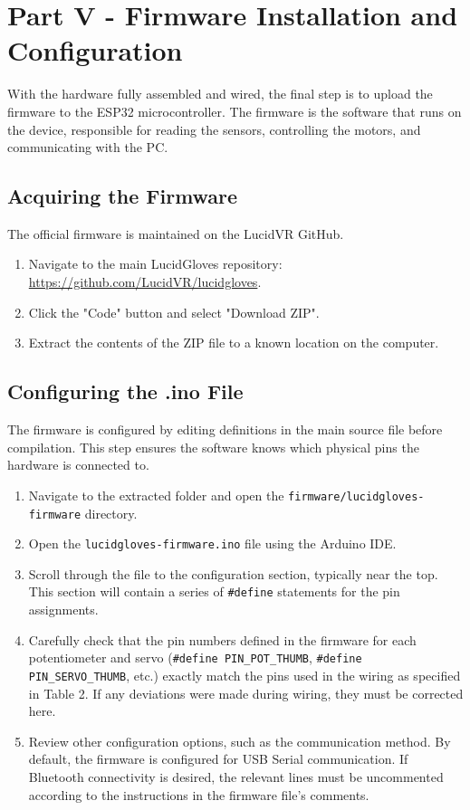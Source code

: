 \documentclass{article}
\begin{document}
\newpage
\section{Part V - Firmware Installation and Configuration}
With the hardware fully assembled and wired, the final step is to upload the firmware to the ESP32 microcontroller. The firmware is the software that runs on the device, responsible for reading the sensors, controlling the motors, and communicating with the PC.

\subsection{Acquiring the Firmware}
The official firmware is maintained on the LucidVR GitHub.
\begin{enumerate}
    \item Navigate to the main LucidGloves repository: \url{https://github.com/LucidVR/lucidgloves}.
    \item Click the "Code" button and select "Download ZIP".
    \item Extract the contents of the ZIP file to a known location on the computer.
\end{enumerate}

\subsection{Configuring the .ino File}
The firmware is configured by editing definitions in the main source file before compilation. This step ensures the software knows which physical pins the hardware is connected to.
\begin{enumerate}
    \item Navigate to the extracted folder and open the \texttt{firmware/lucidgloves-firmware} directory.
    \item Open the \texttt{lucidgloves-firmware.ino} file using the Arduino IDE.
    \item Scroll through the file to the configuration section, typically near the top. This section will contain a series of \texttt{\#define} statements for the pin assignments.
    \item Carefully check that the pin numbers defined in the firmware for each potentiometer and servo (\texttt{\#define PIN\_POT\_THUMB}, \texttt{\#define PIN\_SERVO\_THUMB}, etc.) exactly match the pins used in the wiring as specified in Table 2. If any deviations were made during wiring, they must be corrected here.
    \item Review other configuration options, such as the communication method. By default, the firmware is configured for USB Serial communication. If Bluetooth connectivity is desired, the relevant lines must be uncommented according to the instructions in the firmware file's comments.
\end{enumerate}
\end{document}
